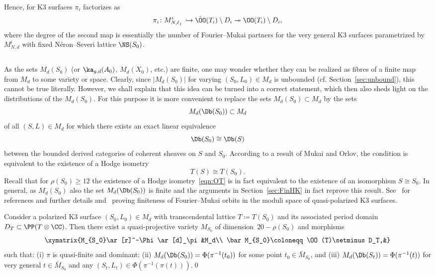 Hence, for K3 surfaces $\pi_i$ factorizes as
\[
\pi_i\colon M^i_{N,\ell_j}\,\hookrightarrow \tilde \OO(T_i)\setminus D_i\twoheadrightarrow \OO(T_i)\setminus
D_i,
\]
where the degree of the second map is essentially the number of Fourier--Mukai partners for the very general K3 surfaces
parametrized by $M^i_{N,d}$ with fixed N\'eron--Severi lattice $\NS(S_0)$.

\subsection{}
As the sets $M_d(S_0)$ (or $\ka_{g,d}(A_0)$, $M_d(X_0)$, etc.) are finite, one may wonder whether they can be realized as fibres of a finite map from $M_d$ to some variety or space. Clearly, since $|M_d(S_0)|$ for varying $(S_0,L_0)\in M_d$ is unbounded (cf. Section~\ref{sec:unbound}), this cannot be true literally. However, we shall explain that this idea can be turned into a correct statement, which then also sheds light on the distributions of the $M_d(S_0)$. For this purpose it is more convenient to replace the sets $M_d(S_0)\subset M_d$ by the sets
\[
M_d(\Db(S_0))\subset M_d
\]
of all
$(S,L)\in M_d$ for which there exists an exact linear equivalence
\begin{equation}\label{eqn:FM}
\Db(S_0)\cong \Db(S)
\end{equation}
between the bounded derived categories of coherent sheaves on $S$ and $S_0$. According to a result of Mukai and Orlov, the condition is equivalent to the existence of a Hodge isometry
\begin{equation}\label{eqn:OT}
T(S)\cong T(S_0).
\end{equation}
Recall that for $\rho(S_0)\geq 12$ the existence of a Hodge isometry~\eqref{eqn:OT} is in fact equivalent to the existence of an isomorphism $S\cong S_0$. In general, as $M_d(S_0)$ also the set $M_d(\Db(S_0))$ is finite and the arguments in Section~\ref{sec:FinHK} in fact reprove this result. See~\cite[Chapter~16]{HuyK3} for references and further details and~\cite{HP} proving finiteness of Fourier--Mukai orbits in the moduli space of quasi-polarized K3 surfaces.

\begin{coro}\label{cor:parOS}
Consider a polarized K3 surface $(S_0,L_0)\in M_d$ with transcendental lattice $T\coloneqq T(S_0)$ and its associated period domain $D_T\subset\PP(T\otimes\CC)$. Then there exist a quasi-projective variety $M_{S_0}$ of dimension~$20-\rho(S_0)$ and morphisms
\[
\xymatrix{M_{S_0}\ar[r]^-\Phi\ar[d]_\pi&M_d\\
\bar M_{S_0}\coloneqq \OO(T)\setminus D_T,&}
\]
such that: {\rm (i)} $\pi$ is quasi-finite and dominant; {\rm (ii)} $M_d(\Db(S_0))=\Phi(\pi^{-1}(t_0))$ for some point $t_0\in \bar M_{S_0}$, and {\rm (iii)} $M_d(\Db(S_t))=\Phi(\pi^{-1}(t))$ for very general $t\in\bar M_{S_0}$ and any $(S_t,L_t)\in\Phi(\pi^{-1}(\pi(t)))$.\qed
\end{coro}


